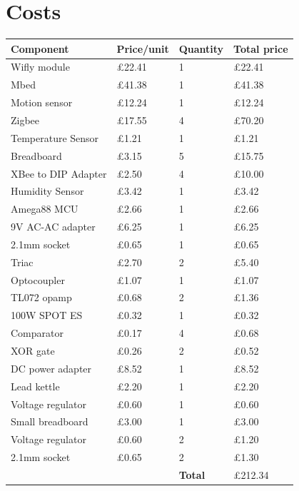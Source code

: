 \documentclass[10.5pt,a4paper,twoside]{report}   %
\begin{document}
\section{Costs}
\label{sec:costs}
\begin{table}
    \begin{tabular}{l|l|l|l}\hline
\textbf{Component} & \textbf{Price/unit} & \textbf{Quantity} & \textbf{Total price} \\ \hline
Wifly module & £22.41 & 1 & £22.41 \\
Mbed & £41.38 & 1 & £41.38 \\
Motion sensor & £12.24 & 1 & £12.24 \\
Zigbee & £17.55 & 4 & £70.20 \\
Temperature Sensor & £1.21 & 1 & £1.21 \\
Breadboard & £3.15 & 5 & £15.75 \\
XBee to DIP Adapter & £2.50 & 4 & £10.00 \\
Humidity Sensor & £3.42 & 1 & £3.42 \\
Amega88 MCU & £2.66 & 1 & £2.66 \\
9V AC-AC adapter & £6.25 & 1 & £6.25 \\
2.1mm socket & £0.65 & 1 & £0.65 \\
Triac & £2.70 & 2 & £5.40 \\
Optocoupler & £1.07 & 1 & £1.07 \\
TL072 opamp & £0.68 & 2 & £1.36 \\
100W SPOT ES & £0.32 & 1 & £0.32 \\
Comparator & £0.17 & 4 & £0.68 \\
XOR gate & £0.26 & 2 & £0.52 \\
DC power adapter & £8.52 & 1 & £8.52 \\
Lead kettle & £2.20 & 1 & £2.20 \\
Voltage regulator & £0.60 & 1 & £0.60 \\
Small breadboard & £3.00 & 1 & £3.00 \\
Voltage regulator & £0.60 & 2 & £1.20 \\
2.1mm socket & £0.65 & 2 & £1.30 \\ \hline
 &  & \textbf{Total} & £212.34 \\
    \end{tabular}
\end{table}
\end{document}
